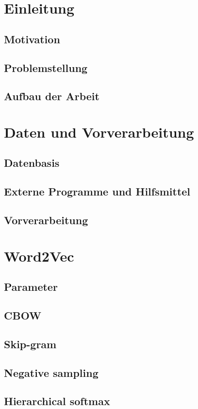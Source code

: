 \documentclass[11pt,a4paper]{article}
\begin{document}
\tableofcontents
\section{Einleitung}
	\subsection{Motivation}
	\subsection{Problemstellung}
	\subsection{Aufbau der Arbeit}
\section{Daten und Vorverarbeitung}
	\subsection{Datenbasis}
	\subsection{Externe Programme und Hilfsmittel}
	\subsection{Vorverarbeitung}
\section{Word2Vec}
	\subsection{Parameter}
	\subsection{CBOW}
	\subsection{Skip-gram}
	\subsection{Negative sampling}
	\subsection{Hierarchical softmax}
\end{document}
